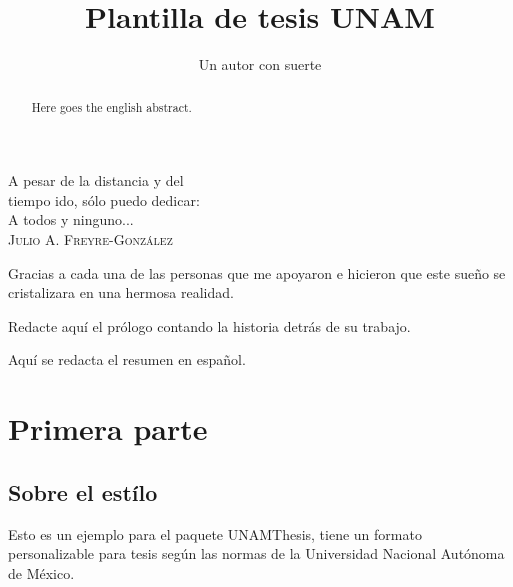 \documentclass[11pt,spanish]{report}
\begin{document}
\title{Plantilla de tesis UNAM}
\author{Un autor con suerte}
\maketitle

\begin{dedication}
A pesar de la distancia y del\\
tiempo ido, sólo puedo dedicar:\\
A todos y ninguno...\\
\textsc{Julio A. Freyre-Gonz\'{a}lez}
\end{dedication}

\begin{acknowledgements}
Gracias a cada una de las personas que me apoyaron e hicieron que
este sueño se cristalizara en una hermosa realidad.
\end{acknowledgements}

\tableofcontents
\clearpage
\listoftables
\clearpage
\listoffigures
\clearpage

\begin{foreword}
Redacte aquí el prólogo contando la historia detrás de su
trabajo.
\end{foreword}

\begin{abstract}
Here goes the english abstract.
\end{abstract}

\begin{resumen}
Aquí se redacta el resumen en español.
\end{resumen}


\part{Primera parte}

\chapter{Sobre el estílo}

Esto es un ejemplo para el paquete UNAMThesis, tiene un formato personalizable para tesis según las normas de la Universidad Nacional Autónoma de México.
\end{document}
